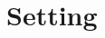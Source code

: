 \documentclass[11pt]{amsart}
\theoremstyle{definition}
\theoremstyle{remark}
\begin{document}
\section{Setting}
\label{sec:setting}
%
\end{document}
